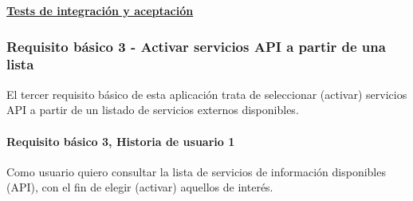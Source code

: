 \documentclass[../ei103948-project-documentation.tex]{subfiles}
\begin{document}
					\begin{center}
						\textbf{\underline{Tests de integración y aceptación}}
					\end{center}

					\testBasicoT

					\newpage



			\subsubsection{Requisito básico 3 - Activar servicios API a partir de una lista}
				El tercer requisito básico de esta aplicación trata de seleccionar (activar) servicios API a partir de un listado de servicios externos disponibles.
				\paragraph{Requisito básico 3, Historia de usuario 1}
				Como usuario quiero consultar la lista de servicios de información disponibles (API), con el fin de elegir (activar) aquellos de interés.
\end{document}
